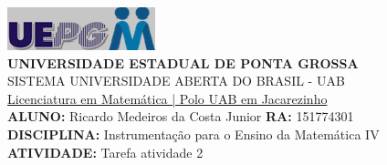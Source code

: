 \documentclass[a4paper, 12pt]{article}
\begin{document}
\includegraphics{logo}\\
\textbf{UNIVERSIDADE ESTADUAL DE PONTA GROSSA} \\
SISTEMA UNIVERSIDADE ABERTA DO BRASIL - UAB \\
\underline{Licenciatura em Matemática | Polo UAB em Jacarezinho} \\
\textbf{ALUNO:} Ricardo Medeiros da Costa Junior   \textbf{RA:} 151774301 \\
\textbf{DISCIPLINA:} Instrumentação para o Ensino da Matemática IV \\
\textbf{ATIVIDADE:} Tarefa atividade 2 \\
\end{document}
